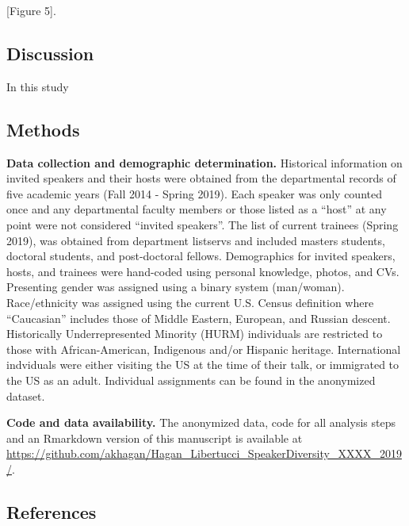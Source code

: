 \documentclass[10pt,]{article}
\begin{document}
{[}Figure 5{]}.

\subsection{Discussion}\label{discussion}

In this study

\subsection{Methods}\label{methods}

\textbf{Data collection and demographic determination.} Historical
information on invited speakers and their hosts were obtained from the
departmental records of five academic years (Fall 2014 - Spring 2019).
Each speaker was only counted once and any departmental faculty members
or those listed as a ``host'' at any point were not considered ``invited
speakers''. The list of current trainees (Spring 2019), was obtained
from department listservs and included masters students, doctoral
students, and post-doctoral fellows. Demographics for invited speakers,
hosts, and trainees were hand-coded using personal knowledge, photos,
and CVs. Presenting gender was assigned using a binary system
(man/woman). Race/ethnicity was assigned using the current U.S. Census
definition where ``Caucasian'' includes those of Middle Eastern,
European, and Russian descent. Historically Underrepresented Minority
(HURM) individuals are restricted to those with African-American,
Indigenous and/or Hispanic heritage. International indviduals were
either visiting the US at the time of their talk, or immigrated to the
US as an adult. Individual assignments can be found in the anonymized
dataset.

\textbf{Code and data availability.} The anonymized data, code for all
analysis steps and an Rmarkdown version of this manuscript is available
at
\url{https://github.com/akhagan/Hagan_Libertucci_SpeakerDiversity_XXXX_2019/}.

\subsection{References}\label{references}

\hypertarget{refs}{}
\end{document}
